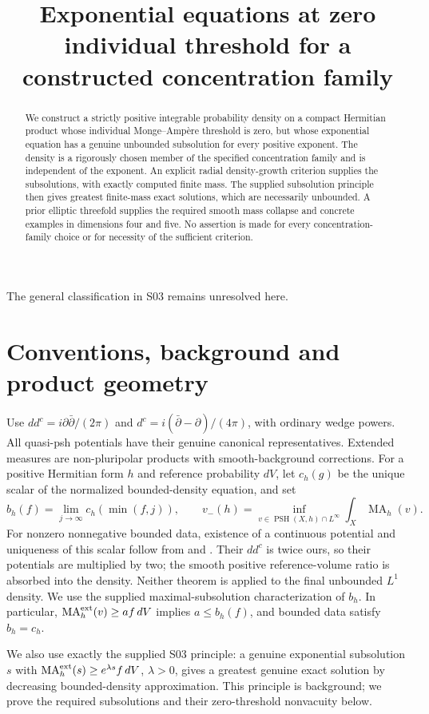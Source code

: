 \documentclass[11pt]{article}
\title{Exponential equations at zero individual threshold\newline
for a constructed concentration family}
\author{}\date{}
\newcommand{\ddc}{dd^c}
\newcommand{\dc}{d^c}
\newcommand{\MA}{\operatorname{MA}}
\newcommand{\PSH}{\operatorname{PSH}}
\theoremstyle{remark}\newtheorem{remark}[theorem]{Remark}
\begin{document}
\maketitle
The general classification in S03 remains unresolved here.
\begin{abstract}
We construct a strictly positive integrable probability density on a
compact Hermitian product whose individual Monge--Amp\`ere threshold
is zero, but whose exponential equation has a genuine unbounded
subsolution for every positive exponent. The density is a rigorously
chosen member of the specified concentration family and is independent
of the exponent. An explicit radial density-growth criterion supplies
the subsolutions, with exactly computed finite mass. The supplied
subsolution principle then gives greatest finite-mass exact solutions,
which are necessarily unbounded. A prior elliptic threefold supplies
the required smooth mass collapse and concrete examples in dimensions
four and five. No assertion is made for every concentration-family
choice or for necessity of the sufficient criterion.
\end{abstract}

\section{Conventions, background and product geometry}
Use $\ddc=i\partial\bar\partial/(2\pi)$ and
$\dc=i(\bar\partial-\partial)/(4\pi)$, with ordinary wedge powers.
All quasi-psh potentials have their genuine canonical representatives.
Extended measures are non-pluripolar products with smooth-background
corrections. For a positive Hermitian form $h$ and reference probability
$dV$, let $c_h(g)$ be the unique scalar of the normalized
bounded-density equation, and set
\[
 b_h(f)=\lim_{j\to\infty}c_h(\min(f,j)),\qquad
 v_-(h)=\inf_{v\in\PSH(X,h)\cap L^\infty}\int_X\MA_h(v).
\]
For nonzero nonnegative bounded data, existence of a continuous
potential and uniqueness of this scalar follow from
\cite[Theorem 0.1]{KN} and \cite[Corollary 0.2]{Ng}.
Their $\ddc$ is twice ours, so their potentials are multiplied by two;
the smooth positive reference-volume ratio is absorbed into the density.
Neither theorem is applied to the final unbounded $L^1$ density.
We use the supplied maximal-subsolution characterization of $b_h$.
In particular, $\MA_h^{\rm ext}(v)\geq af\,dV$ implies $a\leq b_h(f)$,
and bounded data satisfy $b_h=c_h$.

We also use exactly the supplied S03 principle: a genuine exponential
subsolution $s$ with
$\MA_h^{\rm ext}(s)\geq e^{\lambda s}f\,dV$, $\lambda>0$, gives a
greatest genuine exact solution by decreasing bounded-density
approximation. This principle is background; we prove the required
subsolutions and their zero-threshold nonvacuity below.
\end{document}

